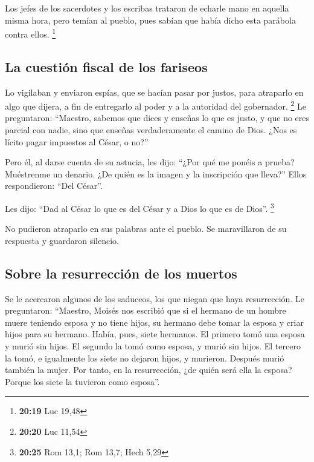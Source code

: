  Los jefes de los sacerdotes y los escribas trataron de
echarle mano en aquella misma hora, pero temían al pueblo, pues sabían
que había dicho esta parábola contra ellos. \footnote{\textbf{20:19} Luc
  19,48}

\hypertarget{la-cuestiuxf3n-fiscal-de-los-fariseos}{%
\subsection{La cuestión fiscal de los
fariseos}\label{la-cuestiuxf3n-fiscal-de-los-fariseos}}

 Lo vigilaban y enviaron espías, que se hacían pasar por
justos, para atraparlo en algo que dijera, a fin de entregarlo al poder
y a la autoridad del gobernador. \footnote{\textbf{20:20} Luc 11,54}
 Le preguntaron: ``Maestro, sabemos que dices y enseñas
lo que es justo, y que no eres parcial con nadie, sino que enseñas
verdaderamente el camino de Dios.  ¿Nos es lícito pagar
impuestos al César, o no?''

 Pero él, al darse cuenta de su astucia, les dijo: ``¿Por
qué me ponéis a prueba?  Muéstrenme un denario. ¿De quién
es la imagen y la inscripción que lleva?'' Ellos respondieron: ``Del
César''.

 Les dijo: ``Dad al César lo que es del César y a Dios lo
que es de Dios''. \footnote{\textbf{20:25} Rom 13,1; Rom 13,7; Hech 5,29}

 No pudieron atraparlo en sus palabras ante el pueblo. Se
maravillaron de su respuesta y guardaron silencio.

\hypertarget{sobre-la-resurrecciuxf3n-de-los-muertos}{%
\subsection{Sobre la resurrección de los
muertos}\label{sobre-la-resurrecciuxf3n-de-los-muertos}}

 Se le acercaron algunos de los saduceos, los que niegan
que haya resurrección.  Le preguntaron: ``Maestro, Moisés
nos escribió que si el hermano de un hombre muere teniendo esposa y no
tiene hijos, su hermano debe tomar la esposa y criar hijos para su
hermano.  Había, pues, siete hermanos. El primero tomó
una esposa y murió sin hijos.  El segundo la tomó como
esposa, y murió sin hijos.  El tercero la tomó, e
igualmente los siete no dejaron hijos, y murieron. 
Después murió también la mujer.  Por tanto, en la
resurrección, ¿de quién será ella la esposa? Porque los siete la
tuvieron como esposa''.

